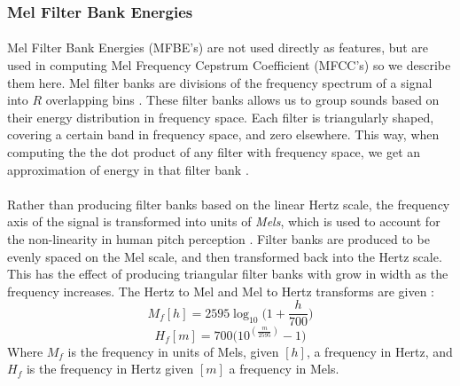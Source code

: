 \documentclass[12pt,letterpaper]{article}
\begin{document}

\subsubsection{Mel Filter Bank Energies}

\paragraph*{}Mel Filter Bank Energies (MFBE's) are not used directly as features, but are used in computing Mel Frequency Cepstrum Coefficient (MFCC's) so we describe them here. Mel filter banks are divisions of the frequency spectrum of a signal into $R$ overlapping bins \cite{Sahidullah,Serizel}. These filter banks allows us to group sounds based on their energy distribution in frequency space. Each filter is triangularly shaped, covering a certain band in frequency space, and zero elsewhere. This way, when computing the the dot product of any filter with frequency space, we get an approximation of energy in that filter bank \cite{Sahidullah,Serizel}. 

\paragraph*{}Rather than producing filter banks based on the linear Hertz scale, the frequency axis of the signal is transformed into units of \textit{Mels}, which is used to account for the non-linearity in human pitch perception \cite{Serizel,Khan,Olson}. Filter banks are produced to be evenly spaced on the Mel scale, and then transformed back into the Hertz scale. This has the effect of producing triangular filter banks with grow in width as the frequency increases. The Hertz to Mel and Mel to Hertz transforms are given \cite{Serizel,Khan}:
\begin{equation}
\label{eqn-HztoMel}
M_f[h] = 2595 \log_{10}\big(1+ \frac{h}{700}\big)
\end{equation}
\begin{equation}
\label{eqn-MeltoHz}
H_f[m] = 700 \big(10^{(\frac{m}{2595})}-1\big)
\end{equation}
Where $M_f$ is the frequency in units of Mels, given $[h]$, a frequency in Hertz, and $H_f$ is the frequency in Hertz given $[m]$ a frequency in Mels.
\end{document}
